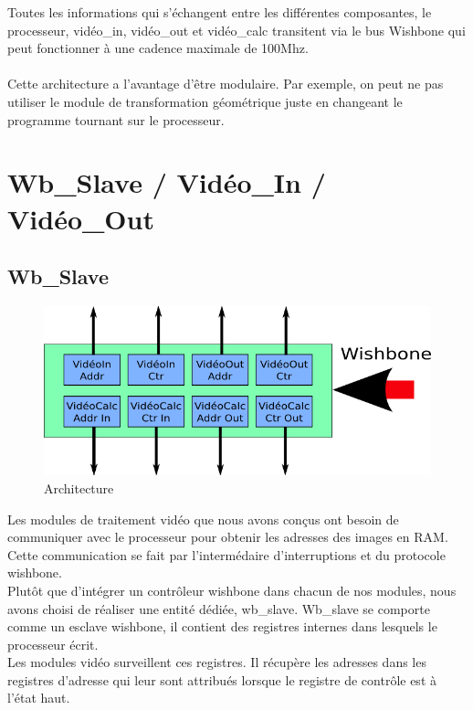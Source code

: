 \documentclass[a4paper,12pt]{report}
\begin{document}
{{{		  Toutes les informations qui s'échangent entre les différentes composantes, le processeur, vidéo\_in, vidéo\_out et vidéo\_calc transitent via le bus Wishbone qui peut fonctionner à une cadence maximale de 100Mhz.\\ \\

		  Cette architecture a l'avantage d'être modulaire. Par exemple, on peut ne pas utiliser le module de transformation géométrique juste en changeant le programme tournant sur le processeur.
	 }



	 \chapter{Wb\_Slave / Vidéo\_In / Vidéo\_Out}
	 \section{Wb\_Slave}

\begin{figure}[!h]
	\centering
	\includegraphics[scale = 0.5]{wb_slave.png}
	\caption{Architecture}
\end{figure}

Les modules de traitement vidéo que nous avons conçus ont besoin de communiquer avec le processeur pour obtenir les adresses des images en RAM. 
Cette communication se fait par l'intermédaire d'interruptions et du protocole wishbone.\\
Plutôt que d'intégrer un contrôleur wishbone dans chacun de nos modules, 
nous avons choisi de réaliser une entité dédiée, wb\_slave.
Wb\_slave se comporte comme un esclave wishbone, il contient des registres internes dans lesquels le processeur écrit. \\
Les modules vidéo surveillent ces registres. Il récupère les adresses dans les registres d'adresse qui leur sont attribués lorsque le registre de contrôle est à 
l'état haut.



}}
\end{document}
